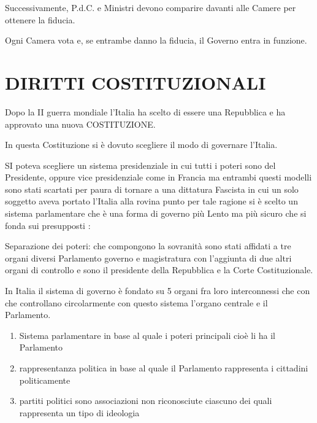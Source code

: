 \documentclass[letterpaper,10pt,italian]{sphinxmanual}
\begin{document}
\sphinxAtStartPar
Successivamente, P.d.C. e Ministri devono comparire davanti alle Camere per ottenere la fiducia.

\sphinxAtStartPar
Ogni Camera vota e, se entrambe danno la fiducia, il Governo entra in funzione.

\sphinxstepscope


\chapter{DIRITTI COSTITUZIONALI}
\label{\detokenize{DIRITTI COSTITUZIONALI:diritti-costituzionali}}\label{\detokenize{DIRITTI COSTITUZIONALI::doc}}
\sphinxAtStartPar
Dopo la II guerra mondiale l’Italia ha scelto di essere una Repubblica e ha approvato una nuova COSTITUZIONE.

\sphinxAtStartPar
In questa Costituzione si è dovuto scegliere il modo di governare l’Italia.

\sphinxAtStartPar
SI poteva scegliere un sistema presidenziale in cui tutti i poteri sono del Presidente, oppure vice presidenziale come in Francia ma entrambi questi modelli sono stati scartati per paura di tornare a una dittatura Fascista in cui un solo soggetto aveva portato l’Italia alla rovina punto per tale ragione si è scelto un sistema parlamentare che è una forma di governo più Lento ma più sicuro che si fonda sui presupposti :

\sphinxAtStartPar
Separazione dei poteri: che compongono la sovranità sono stati affidati a tre organi diversi Parlamento governo e magistratura con l’aggiunta di due altri organi di controllo e sono il presidente della Repubblica e la Corte Costituzionale.

\sphinxAtStartPar
In Italia il sistema di governo è fondato su 5 organi fra loro interconnessi che con che controllano circolarmente con questo sistema l’organo centrale e il Parlamento.

\begin{figure}[htbp]
\centering

\noindent{}
\end{figure}
\begin{enumerate}
%
\item {} 
\sphinxAtStartPar
Sistema parlamentare in base al quale i poteri principali cioè li ha il Parlamento

\item {} 
\sphinxAtStartPar
rappresentanza politica in base al quale il Parlamento rappresenta i cittadini politicamente

\item {} 
\sphinxAtStartPar
partiti politici sono associazioni non riconosciute ciascuno dei quali rappresenta un tipo di ideologia

\end{enumerate}
\end{document}
